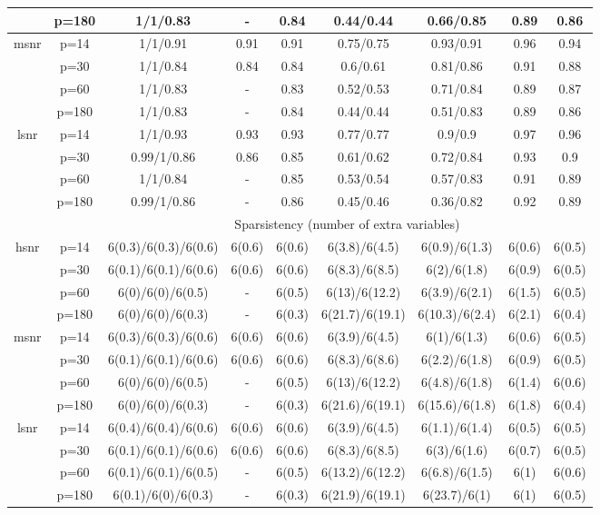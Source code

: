\begin{table}[ht]
{\begin{tabular}{|c|c|ccccccc|}
   & p=180 & 1/1/0.83 & - & 0.84 & 0.44/0.44 & 0.66/0.85 & 0.89 & 0.86 \\ 
  \midrule\multirow{4}[2]{*}{msnr} & p=14 & 1/1/0.91 & 0.91 & 0.91 & 0.75/0.75 & 0.93/0.91 & 0.96 & 0.94 \\ 
   & p=30 & 1/1/0.84 & 0.84 & 0.84 & 0.6/0.61 & 0.81/0.86 & 0.91 & 0.88 \\ 
   & p=60 & 1/1/0.83 & - & 0.83 & 0.52/0.53 & 0.71/0.84 & 0.89 & 0.87 \\ 
   & p=180 & 1/1/0.83 & - & 0.84 & 0.44/0.44 & 0.51/0.83 & 0.89 & 0.86 \\ 
  \midrule\multirow{4}[2]{*}{lsnr} & p=14 & 1/1/0.93 & 0.93 & 0.93 & 0.77/0.77 & 0.9/0.9 & 0.97 & 0.96 \\ 
   & p=30 & 0.99/1/0.86 & 0.86 & 0.85 & 0.61/0.62 & 0.72/0.84 & 0.93 & 0.9 \\ 
   & p=60 & 1/1/0.84 & - & 0.85 & 0.53/0.54 & 0.57/0.83 & 0.91 & 0.89 \\ 
   & p=180 & 0.99/1/0.86 & - & 0.86 & 0.45/0.46 & 0.36/0.82 & 0.92 & 0.89 \\ 
   \midrule 
 \multicolumn{1}{|c}{} &       & \multicolumn{7}{c|}{Sparsistency (number of extra variables)} \\
\midrule\multirow{4}[2]{*}{hsnr} & p=14 & 6(0.3)/6(0.3)/6(0.6) & 6(0.6) & 6(0.6) & 6(3.8)/6(4.5) & 6(0.9)/6(1.3) & 6(0.6) & 6(0.5) \\ 
   & p=30 & 6(0.1)/6(0.1)/6(0.6) & 6(0.6) & 6(0.6) & 6(8.3)/6(8.5) & 6(2)/6(1.8) & 6(0.9) & 6(0.5) \\ 
   & p=60 & 6(0)/6(0)/6(0.5) & - & 6(0.5) & 6(13)/6(12.2) & 6(3.9)/6(2.1) & 6(1.5) & 6(0.5) \\ 
   & p=180 & 6(0)/6(0)/6(0.3) & - & 6(0.3) & 6(21.7)/6(19.1) & 6(10.3)/6(2.4) & 6(2.1) & 6(0.4) \\ 
  \midrule\multirow{4}[2]{*}{msnr} & p=14 & 6(0.3)/6(0.3)/6(0.6) & 6(0.6) & 6(0.6) & 6(3.9)/6(4.5) & 6(1)/6(1.3) & 6(0.6) & 6(0.5) \\ 
   & p=30 & 6(0.1)/6(0.1)/6(0.6) & 6(0.6) & 6(0.6) & 6(8.3)/6(8.6) & 6(2.2)/6(1.8) & 6(0.9) & 6(0.5) \\ 
   & p=60 & 6(0)/6(0)/6(0.5) & - & 6(0.5) & 6(13)/6(12.2) & 6(4.8)/6(1.8) & 6(1.4) & 6(0.6) \\ 
   & p=180 & 6(0)/6(0)/6(0.3) & - & 6(0.3) & 6(21.6)/6(19.1) & 6(15.6)/6(1.8) & 6(1.8) & 6(0.4) \\ 
  \midrule\multirow{4}[2]{*}{lsnr} & p=14 & 6(0.4)/6(0.4)/6(0.6) & 6(0.6) & 6(0.6) & 6(3.9)/6(4.5) & 6(1.1)/6(1.4) & 6(0.5) & 6(0.5) \\ 
   & p=30 & 6(0.1)/6(0.1)/6(0.6) & 6(0.6) & 6(0.6) & 6(8.3)/6(8.5) & 6(3)/6(1.6) & 6(0.7) & 6(0.5) \\ 
   & p=60 & 6(0.1)/6(0.1)/6(0.5) & - & 6(0.5) & 6(13.2)/6(12.2) & 6(6.8)/6(1.5) & 6(1) & 6(0.6) \\ 
   & p=180 & 6(0.1)/6(0)/6(0.3) & - & 6(0.3) & 6(21.9)/6(19.1) & 6(23.7)/6(1) & 6(1) & 6(0.5) \\ 
   \bottomrule 
\end{tabular}
}
\end{table}
